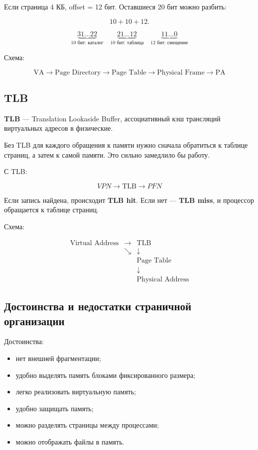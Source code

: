 \documentclass[12pt,a4paper]{article}
\theoremstyle{remark}
\begin{document}
Если страница 4 КБ, offset = 12 бит. Оставшиеся 20 бит можно разбить:

\[
10 + 10 + 12.
\]

\[
\underbrace{31 \ldots 22}_{10 \text{ бит: каталог}}
\quad
\underbrace{21 \ldots 12}_{10 \text{ бит: таблица}}
\quad
\underbrace{11 \ldots 0}_{12 \text{ бит: смещение}}
\]

Схема:

\[
\boxed{\text{VA}}
\rightarrow
\boxed{\text{Page Directory}}
\rightarrow
\boxed{\text{Page Table}}
\rightarrow
\boxed{\text{Physical Frame}}
\rightarrow
\boxed{\text{PA}}
\]

\subsection{TLB}

\textbf{TLB} --- Translation Lookaside Buffer, ассоциативный кэш трансляций виртуальных адресов в физические.

Без TLB для каждого обращения к памяти нужно сначала обратиться к таблице страниц, а затем к самой памяти. Это сильно замедлило бы работу.

С TLB:

\[
\boxed{VPN}
\rightarrow
\boxed{\text{TLB}}
\rightarrow
\boxed{PFN}
\]

Если запись найдена, происходит \textbf{TLB hit}. Если нет --- \textbf{TLB miss}, и процессор обращается к таблице страниц.

Схема:

\[
\begin{array}{ccc}
\boxed{\text{Virtual Address}} & \longrightarrow & \boxed{\text{TLB}} \\
 & \searrow & \downarrow \\
 & & \boxed{\text{Page Table}} \\
 & & \downarrow \\
 & & \boxed{\text{Physical Address}}
\end{array}
\]

\subsection{Достоинства и недостатки страничной организации}

Достоинства:
\begin{itemize}
    \item нет внешней фрагментации;
    \item удобно выделять память блоками фиксированного размера;
    \item легко реализовать виртуальную память;
    \item удобно защищать память;
    \item можно разделять страницы между процессами;
    \item можно отображать файлы в память.
\end{itemize}
\end{document}

